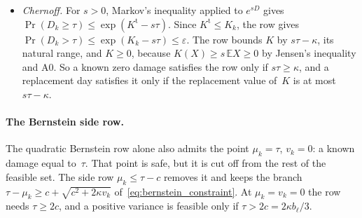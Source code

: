 \documentclass[11pt,a4paper]{article}
\theoremstyle{plain}
\theoremstyle{definition}
\theoremstyle{remark}
\begin{document}
\begin{itemize}
    Every weighted term satisfies $w_t(X_t - \mathbb{E}X_t) \le w_t\, b_t \le b_\ell$, with $b_t$ the width of the range of~$X_t$, whatever the schedule, because $w_t \le 1$.
    Bernstein's inequality for independent terms bounded above by~$b_\ell$ gives $\Pr(D - m \ge a) \le \exp\bigl(-a^2/(2(V + b_\ell\,a/3))\bigr)$ for $a > 0$; the right side is at most~$\varepsilon$ exactly when $a^2 - 2c\,a - 2\kappa V \ge 0$.
    With $v_k \ge 0$, the row and its side row give $d_k \ge 2c$.
    The function $a^2/(2(V + b_\ell\,a/3))$ increases in $a > 0$ and decreases in~$V$, and $\tau - m \ge d_k \ge 2c$; so $\Pr(D_k > \tau) \le \varepsilon$ when $b_\ell > 0$.
    When $b_\ell = 0$, every term is constant and $D_k = m \le \tau$.
  \item \emph{Chernoff.} For $s > 0$, Markov's inequality applied to $e^{sD}$ gives $\Pr(D_k \ge \tau) \le \exp(K^{\mathrm{t}} - s\tau)$.
    Since $K^{\mathrm{t}} \le K_k$, the row gives $\Pr(D_k > \tau) \le \exp(K_k - s\tau) \le \varepsilon$.
    The row bounds $K$ by $s\tau - \kappa$, its natural range, and $K \ge 0$, because $K(X) \ge s\,\mathbb{E}X \ge 0$ by Jensen's inequality and A0.
    So a known zero damage satisfies the row only if $s\tau \ge \kappa$, and a replacement day satisfies it only if the replacement value of~$K$ is at most $s\tau - \kappa$.
\end{itemize}

\paragraph{The Bernstein side row.}
The quadratic Bernstein row alone also admits the point $\mu_k = \tau$, $v_k = 0$: a known damage equal to~$\tau$.
That point is safe, but it is cut off from the rest of the feasible set.
The side row $\mu_k \le \tau - c$ removes it and keeps the branch $\tau - \mu_k \ge c + \sqrt{c^2 + 2\kappa v_k}$ of~\eqref{eq:bernstein_constraint}.
At $\mu_k = v_k = 0$ the row needs $\tau \ge 2c$, and a positive variance is feasible only if $\tau > 2c = 2\kappa b_\ell/3$.
\end{document}

